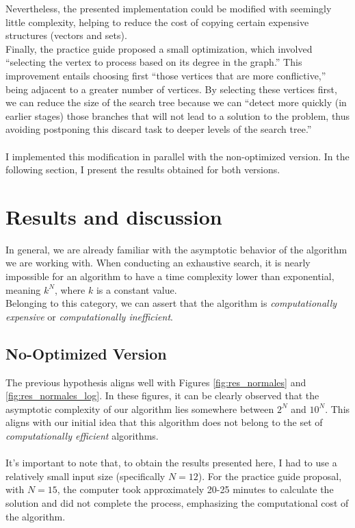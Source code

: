 \documentclass[british,a4paper,11pt,titlepage]{article}
\begin{document}
Nevertheless, the presented implementation could be modified with seemingly little complexity, helping to reduce the cost of copying certain expensive structures (vectors and sets).
\\
Finally, the practice guide proposed a small optimization, which involved ``selecting the vertex to process based on its degree in the graph.'' This improvement entails choosing first ``those vertices that are more conflictive,'' being adjacent to a greater number of vertices. By selecting these vertices first, we can reduce the size of the search tree because we can ``detect more quickly (in earlier stages) those branches that will not lead to a solution to the problem, thus avoiding postponing this discard task to deeper levels of the search tree.''
\\
\\
I implemented this modification in parallel with the non-optimized version. In the following section, I present the results obtained for both versions.

\cleardoublepage

\section{Results and discussion}
\label{sec:results}
In general, we are already familiar with the asymptotic behavior of the algorithm we are working with. When conducting an exhaustive search, it is nearly impossible for an algorithm to have a time complexity lower than exponential, meaning $k^N$, where $k$ is a constant value.
\\
Belonging to this category, we can assert that the algorithm is \emph{computationally expensive} or \emph{computationally inefficient}.

\subsection{No-Optimized Version}

The previous hypothesis aligns well with Figures \ref{fig:res_normales} and \ref{fig:res_normales_log}. In these figures, it can be clearly observed that the asymptotic complexity of our algorithm lies somewhere between $2^N$ and $10^N$. This aligns with our initial idea that this algorithm does not belong to the set of \emph{computationally efficient} algorithms.
\\
\\
It's important to note that, to obtain the results presented here, I had to use a relatively small input size (specifically $N=12$). For the practice guide proposal, with $N=15$, the computer took approximately 20-25 minutes to calculate the solution and did not complete the process, emphasizing the computational cost of the algorithm.
\end{document}

